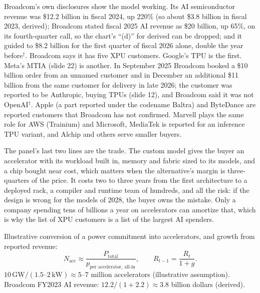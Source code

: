 \documentclass[11pt,letterpaper]{article}
\newenvironment{formulas}{\begin{tcolorbox}[formulabox]}{\end{tcolorbox}}
\begin{document}
Broadcom's own disclosures show the model working. Its AI semiconductor revenue was \$12.2 billion in fiscal 2024, up 220\% (so about \$3.8 billion in fiscal 2023, derived); Broadcom stated fiscal 2025 AI revenue as \$20 billion, up 65\%, on its fourth-quarter call, so the chart's ``(d)'' for derived can be dropped; and it guided to \$8.2 billion for the first quarter of fiscal 2026 alone, double the year before$^\dagger$. Broadcom says it has five XPU customers. Google's TPU is the first. Meta's MTIA (slide 22) is another. In September 2025 Broadcom booked a \$10 billion order from an unnamed customer and in December an additional \$11 billion from the same customer for delivery in late 2026; the customer was reported to be Anthropic, buying TPUs (slide 12), and Broadcom said it was not OpenAI$^\dagger$. Apple (a part reported under the codename Baltra) and ByteDance are reported customers that Broadcom has not confirmed. Marvell plays the same role for AWS (Trainium) and Microsoft, MediaTek is reported for an inference TPU variant, and Alchip and others serve smaller buyers.

The panel's last two lines are the trade. The custom model gives the buyer an accelerator with its workload built in, memory and fabric sized to its models, and a chip bought near cost, which matters when the alternative's margin is three-quarters of the price. It costs two to three years from the first architecture to a deployed rack, a compiler and runtime team of hundreds, and all the risk: if the design is wrong for the models of 2028, the buyer owns the mistake. Only a company spending tens of billions a year on accelerators can amortize that, which is why the list of XPU customers is a list of the largest AI spenders.

\begin{formulas}
Illustrative conversion of a power commitment into accelerators, and growth from reported revenue:
\[
N_{\text{acc}}\approx\frac{P_{\text{total}}}{p_{\text{per accelerator, all-in}}},\qquad
R_{t-1}=\frac{R_t}{1+g} .
\]
$10\,\text{GW}/(1.5\text{--}2\,\text{kW})\approx 5$--$7$ million accelerators (illustrative assumption). Broadcom FY2023 AI revenue: $12.2/(1+2.2)\approx 3.8$ billion dollars (derived).
\end{formulas}
\end{document}
